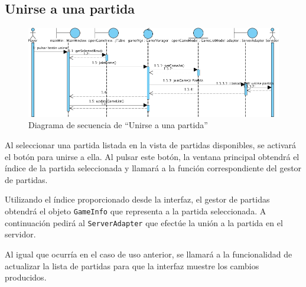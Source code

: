 \subsection{Unirse a una partida}

\begin{figure}[ht]
\centering
\includegraphics[scale=0.6]{img/ch03devel-joingame.png}
\caption{Diagrama de secuencia de ``Unirse a una partida''}
\end{figure}

Al seleccionar una partida listada en la vista de partidas disponibles, se
activará el botón para unirse a ella. Al pulsar este botón, la ventana
principal obtendrá el índice de la partida seleccionada y llamará a la función
correspondiente del gestor de partidas.

Utilizando el índice proporcionado desde la interfaz, el gestor de partidas
obtendrá el objeto \texttt{GameInfo} que representa a la partida seleccionada.
A continuación pedirá al \texttt{ServerAdapter} que efectúe la unión a la
partida en el servidor.

Al igual que ocurría en el caso de uso anterior, se llamará a la funcionalidad
de actualizar la lista de partidas para que la interfaz muestre los cambios
producidos.

